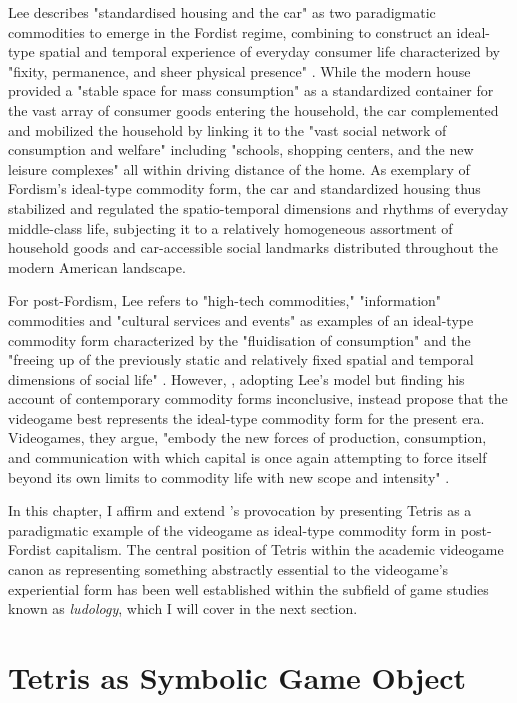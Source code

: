 Lee describes "standardised housing and the car" \autocite*[129]{Lee2003} as two paradigmatic commodities to emerge in the Fordist regime, combining to construct an ideal-type spatial and temporal experience of everyday consumer life characterized by "fixity, permanence, and sheer physical presence" \autocite[130]{Lee2003}. While the modern house provided a "stable space for mass consumption" as a standardized container for the vast array of consumer goods entering the household, the car complemented and mobilized the household by linking it to the "vast social network of consumption and welfare" including "schools, shopping centers, and the new leisure complexes" \autocite[129-30]{Lee2003} all within driving distance of the home. As exemplary of Fordism's ideal-type commodity form, the car and standardized housing thus stabilized and regulated the spatio-temporal dimensions and rhythms of everyday middle-class life, subjecting it to a relatively homogeneous assortment of household goods and car-accessible social landmarks distributed throughout the modern American landscape.

For post-Fordism, Lee refers to "high-tech commodities," "information" commodities and "cultural services and events" \autocite[128]{Lee2003} as examples of an ideal-type commodity form characterized by the "fluidisation of consumption" and the "freeing up of the previously static and relatively fixed spatial and temporal dimensions of social life" \autocite[133]{Lee2003}. However, \citeauthor{Kline2003}, adopting Lee's model but finding his account of contemporary commodity forms inconclusive, instead propose that the videogame best represents the ideal-type commodity form for the present era. Videogames, they argue, "embody the new forces of production, consumption, and communication with which capital is once again attempting to force itself beyond its own limits to commodity life with new scope and intensity" \autocite*[76]{Kline2003}.

In this chapter, I affirm and extend \citeauthor{Kline2003}'s provocation by presenting Tetris as a paradigmatic example of the videogame as ideal-type commodity form in post-Fordist capitalism. The central position of Tetris within the academic videogame canon as representing something abstractly essential to the videogame's experiential form has been well established within the subfield of game studies known as \emph{ludology}, which I will cover in the next section.

\section{Tetris as Symbolic Game Object}

